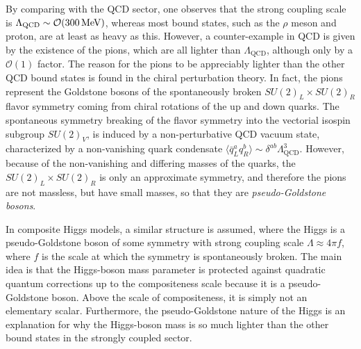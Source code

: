 By comparing with the QCD sector, one observes that the strong coupling scale is $\Lambda_\mathrm{QCD} \sim \mathcal{O}(300\,\text{Me\hspace{-.08em}V})$, whereas most bound states, such as the $\rho$ meson and proton, are at least as heavy as this.
However, a counter-example in QCD is given by the existence of the pions, which are all lighter than $\Lambda_\mathrm{QCD}$, although only by a $\mathcal{O}(1)$ factor.
The reason for the pions to be appreciably lighter than the other QCD bound states is found in the chiral perturbation theory. 
In fact, the pions represent the Goldstone bosons of the spontaneously broken $SU(2)_L \times SU(2)_R$ flavor symmetry coming from chiral rotations of the up and down quarks. 
The spontaneous symmetry breaking of the flavor symmetry into the vectorial isospin subgroup $SU(2)_V$, is induced by a non-perturbative QCD vacuum state, characterized by a non-vanishing quark condensate $\langle \bar{q}^a_L q^b_R \rangle \sim \delta^{ab}\Lambda^3_\mathrm{QCD}$.
However, because of the non-vanishing and differing masses of the quarks, the $SU(2)_L \times SU(2)_R$ is only an approximate symmetry, and therefore the pions are not massless, but have small masses, so that they are \textit{pseudo-Goldstone bosons}.

In composite Higgs models, a similar structure is assumed, where the Higgs is a pseudo-Goldstone boson of some symmetry with strong coupling scale $\Lambda \approx 4\pi f$,
where $f$ is the scale at which the symmetry is spontaneously broken.
The main idea is that the Higgs-boson mass parameter is protected against quadratic quantum corrections up to the compositeness scale because it is a pseudo-Goldstone boson. 
Above the scale of compositeness, it is simply not an elementary scalar.
Furthermore, the pseudo-Goldstone nature of the Higgs is an explanation for why the Higgs-boson mass is so much lighter than the other bound states in the strongly coupled sector.

